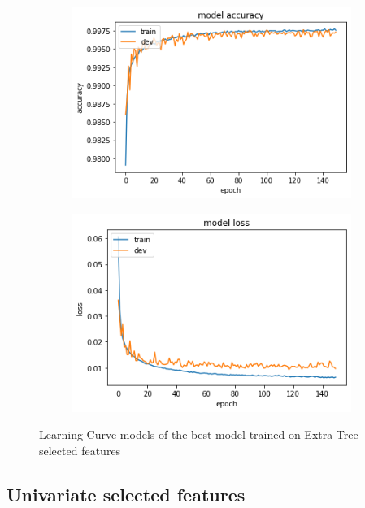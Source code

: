 \begin{figure}[h]
\center
  \begin{subfigure}[b]{0.6\columnwidth}
    \includegraphics[width=\linewidth]{img/learn3.png}
  \end{subfigure}
  \hfill %
  \begin{subfigure}[b]{0.6\columnwidth}
 \includegraphics[width=\linewidth]{img/learn4.png}
  \end{subfigure}
\caption{Learning Curve models of the best model trained on Extra Tree selected features}
\end{figure}

\subsection{Univariate selected features}

